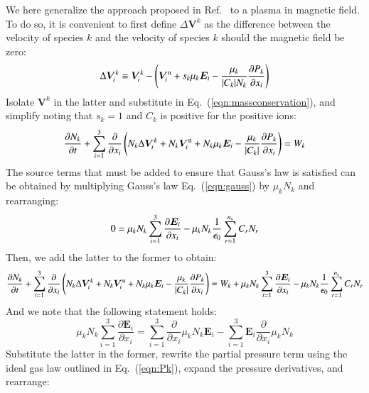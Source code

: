 \documentclass[twoside,onecolumn,10pt]{waflarticle}
\renewcommand{\vec}[1]{\bm{#1}}
\newcommand{\ns}{{n_{\rm s}}}
\renewcommand{\vec}[1]{\bm{ #1 }}
\begin{document}
We here generalize the approach proposed in Ref.\ \cite{jcp:2014:parent} to a plasma in magnetic field. To do so, it is convenient to first define $\Delta \vec{V}^k$ as the difference between the velocity of species $k$ and the velocity of species $k$ should the magnetic field be zero:
%
\begin{equation}
\Delta \vec{V}^k_i \equiv \vec{V}^k_i - \left(\vec{V}^{\rm n}_i+ s_k \mu_k  \vec{E}_i
             -   \frac{\mu_k}{|C_k| N_k} \frac{\partial P_k}{\partial x_i}\right)
\label{eqn:deltaV}
\end{equation}
%
Isolate $\vec{V}^k$ in the latter and substitute in Eq.\ (\ref{eqn:massconservation}), and simplify noting that $s_k=1$ and $C_k$ is positive for the positive ions: 
%
\begin{equation}
  \frac{\partial N_{k}}{\partial t} + \sum_{i=1}^3 \frac{\partial}{\partial x_i} \left(N_k \Delta \vec{V}_i^k +N_{k} \vec{V}^{\rm n}_i+N_{k}  \mu_k   \vec{E}_i
             -    \frac{\mu_k }{|C_{k}| } \frac{\partial P_{k}}{\partial x_i}\right) = W_{k}
\end{equation}
%
The source terms that must be added to ensure that Gauss's law is satisfied can be obtained by multiplying Gauss's law Eq.\ (\ref{eqn:gauss}) by $\mu_{k} N_{k}$ and rearranging:
%
\begin{equation}
0=\mu_{k} N_{k} \sum_{i=1}^3 \frac{\partial \vec{E}_i}{\partial x_i}-\mu_{k} N_{k}\frac{1}{\epsilon_0} \sum_{r=1}^\ns C_r N_r 
\end{equation}
%
Then, we add the latter to the former to obtain:
%
\begin{equation}
  \frac{\partial N_{k}}{\partial t} + \sum_{i=1}^3 \frac{\partial}{\partial x_i} \left(N_k \Delta \vec{V}_i^k +N_{k} \vec{V}^{\rm n}_i+N_{k}  \mu_k  \vec{E}_i
             -    \frac{\mu_k }{|C_{k}| } \frac{\partial P_{k}}{\partial x_i}\right) = W_{k}+\mu_{k} N_{k} \sum_{i=1}^3 \frac{\partial \vec{E}_i}{\partial x_i}-\mu_{k} N_{k}\frac{1}{\epsilon_0} \sum_{r=1}^\ns C_r N_r 
\end{equation}
%
And we note that the following statement holds:
%
\begin{equation}
\mu_{k} N_{k} \sum_{i=1}^3 \frac{\partial \vec{E}_i}{\partial x_i}
= \sum_{i=1}^3 \frac{\partial }{\partial x_i} \mu_{k} N_{k} \vec{E}_i
 - \sum_{i=1}^3 \vec{E}_i \frac{\partial }{\partial x_i} \mu_{k} N_{k}
\end{equation}
%
Substitute the latter in the former, rewrite the partial pressure term using the ideal gas law outlined in Eq.\ (\ref{eqn:Pk}), expand the pressure derivatives, and rearrange:
\end{document}
